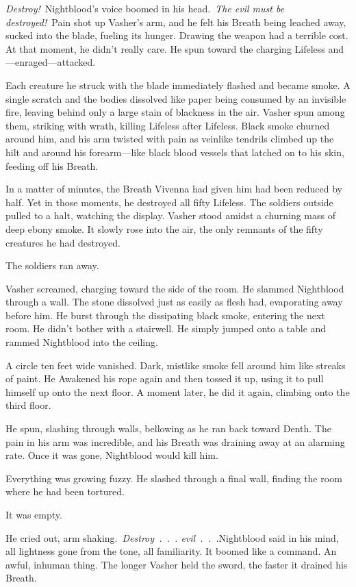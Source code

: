 \textit{Destroy!}~Nightblood’s voice boomed in his head.~\textit{The evil must be destroyed!}~Pain shot up Vasher’s arm, and he felt his Breath being leached away, sucked into the blade, fueling its hunger. Drawing the weapon had a terrible cost. At that moment, he didn’t really care. He spun toward the charging Lifeless and—enraged—attacked.

Each creature he struck with the blade immediately flashed and became smoke. A single scratch and the bodies dissolved like paper being consumed by an invisible fire, leaving behind only a large stain of blackness in the air. Vasher spun among them, striking with wrath, killing Lifeless after Lifeless. Black smoke churned around him, and his arm twisted with pain as veinlike tendrils climbed up the hilt and around his forearm—like black blood vessels that latched on to his skin, feeding off his Breath.

In a matter of minutes, the Breath Vivenna had given him had been reduced by half. Yet in those moments, he destroyed all fifty Lifeless. The soldiers outside pulled to a halt, watching the display. Vasher stood amidst a churning mass of deep ebony smoke. It slowly rose into the air, the only remnants of the fifty creatures he had destroyed.

The soldiers ran away.

Vasher screamed, charging toward the side of the room. He slammed Nightblood through a wall. The stone dissolved just as easily as flesh had, evaporating away before him. He burst through the dissipating black smoke, entering the next room. He didn’t bother with a stairwell. He simply jumped onto a table and rammed Nightblood into the ceiling.

A circle ten feet wide vanished. Dark, mistlike smoke fell around him like streaks of paint. He Awakened his rope again and then tossed it up, using it to pull himself up onto the next floor. A moment later, he did it again, climbing onto the third floor.

He spun, slashing through walls, bellowing as he ran back toward Denth. The pain in his arm was incredible, and his Breath was draining away at an alarming rate. Once it was gone, Nightblood would kill him.

Everything was growing fuzzy. He slashed through a final wall, finding the room where he had been tortured.

It was empty.

He cried out, arm shaking.~\textit{Destroy~.~.~. evil~.~.~.}Nightblood said in his mind, all lightness gone from the tone, all familiarity. It boomed like a command. An awful, inhuman thing. The longer Vasher held the sword, the faster it drained his Breath.

